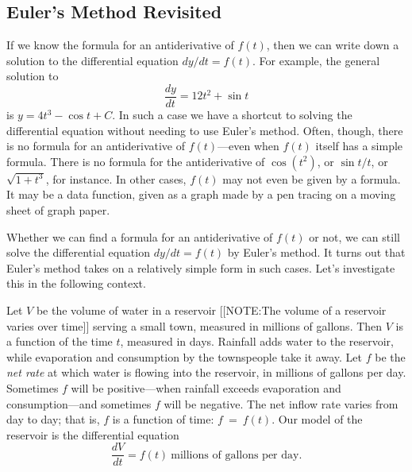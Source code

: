 \subsection{Euler's Method Revisited}
\label{subsec:eulers-method-revisited}

If we know the formula for an antiderivative of $f(t)$, then we can
write down a solution to the differential equation $dy/dt = f(t)$.
For example, the general solution to
        \[
\dfrac{dy}{dt} = 12t^2 + \sin{t}
\]
is $y = 4t^3 - \cos{t} + C$.  In such a case we have a shortcut to solving the differential equation without needing to use Euler's method.  Often, though, there is no formula for an antiderivative of $f(t)$---even when $f(t)$ itself has a simple formula.  There is no formula for the antiderivative of $\cos(t^2)$, or $\sin{t}/t$, or $\sqrt{1 + t^3}$, for instance.  In other cases, $f(t)$ may not even be given by a formula.  It may be a data function, given as a graph made by a pen tracing on a moving sheet of graph paper.

        Whether we can find a formula for an antiderivative of $f(t)$ or not, we can still solve the differential equation $dy/dt = f(t)$ by Euler's method. It turns out that Euler's method takes on a relatively simple form in such cases.  Let's investigate this in the following context.  

        Let $V$ be the volume of water in a reservoir 
        [[NOTE:The volume  of a reservoir  varies over time]]
serving a small town, measured in millions of gallons.  Then $V$ is a function of the time $t$, measured in days.  Rainfall adds water to the reservoir, while evaporation and consumption by the townspeople take it away.  Let $f$ be the {\em net rate\/} at which water is flowing into the reservoir, in millions of gallons per day.  Sometimes $f$ will be positive---when rainfall exceeds evaporation and consumption---and sometimes $f$ will be negative.  The net inflow rate varies from day to day; that is, $f$ is a function of time: $f~=~f(t)$.  Our model of the reservoir is the differential equation
        \[
\dfrac{dV}{dt} = f(t) \ 
                \mbox{millions of gallons per day}.
\]


